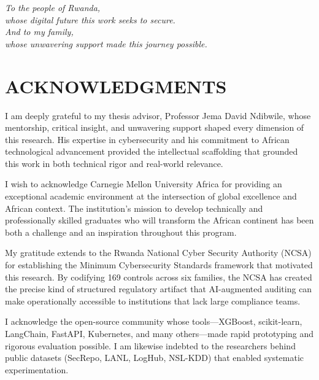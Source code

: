 \documentclass[12pt,oneside]{report}
\begin{document}
\newpage
\thispagestyle{empty}
\vspace*{2in}
\begin{center}
\textit{To the people of Rwanda,\\
whose digital future this work seeks to secure.\\[12pt]
And to my family,\\
whose unwavering support made this journey possible.}
\end{center}

\newpage
{}
\setcounter{page}{4}
\chapter*{ACKNOWLEDGMENTS}

I am deeply grateful to my thesis advisor, Professor Jema David Ndibwile, whose mentorship, critical insight, and unwavering support shaped every dimension of this research. His expertise in cybersecurity and his commitment to African technological advancement provided the intellectual scaffolding that grounded this work in both technical rigor and real-world relevance.

I wish to acknowledge Carnegie Mellon University Africa for providing an exceptional academic environment at the intersection of global excellence and African context. The institution's mission to develop technically and professionally skilled graduates who will transform the African continent has been both a challenge and an inspiration throughout this program.

My gratitude extends to the Rwanda National Cyber Security Authority (NCSA) for establishing the Minimum Cybersecurity Standards framework that motivated this research. By codifying 169 controls across six families, the NCSA has created the precise kind of structured regulatory artifact that AI-augmented auditing can make operationally accessible to institutions that lack large compliance teams.

I acknowledge the open-source community whose tools—XGBoost, scikit-learn, LangChain, FastAPI, Kubernetes, and many others—made rapid prototyping and rigorous evaluation possible. I am likewise indebted to the researchers behind public datasets (SecRepo, LANL, LogHub, NSL-KDD) that enabled systematic experimentation.
\end{document}
